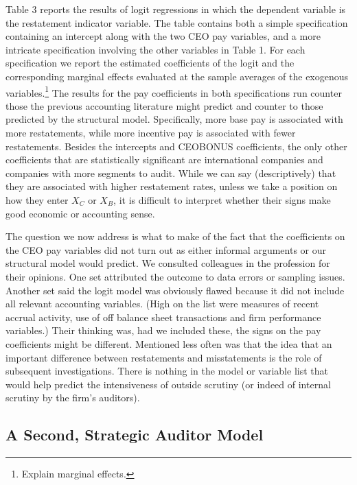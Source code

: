 Table 3 reports the results of logit regressions in which the dependent
variable is the restatement indicator variable. The table contains both a simple 
specification containing an intercept along with the two CEO pay variables, 
and a more intricate specification involving the other variables in Table 1.
For each specification we report the estimated coefficients of the logit and the 
corresponding marginal effects evaluated at the sample averages of the exogenous
variables.\footnote{Explain marginal effects.} The results for the pay coefficients
in both specifications run counter those the previous accounting literature might
predict and counter to those predicted by the structural model.
Specifically,  more base pay is associated with more
restatements, while more incentive pay is associated with fewer restatements.
Besides the intercepts and CEOBONUS coefficients, the only other coefficients 
that are statistically significant are international companies and companies with 
more segments to audit. While we can say (descriptively) that they are associated
with higher restatement rates, unless we take a position on how they enter
 $X_C$ or $X_B$, it is difficult to interpret whether their signs make good economic
or accounting sense.

The question we now address is what to make of the fact that the coefficients
on the CEO pay variables did not turn out as either informal arguments or our
structural model would predict. We consulted colleagues in the
profession for their opinions. One set attributed the outcome to data errors
or sampling issues. Another set said the logit model was obviously flawed because
it did not include all relevant accounting variables. (High on the list were measures
of recent accrual activity, use of off balance sheet transactions and firm
performance variables.) Their thinking was, had we included these, the signs
on the pay coefficients might be different. Mentioned less often was that the idea
that an important difference between restatements and misstatements is the role of subsequent
investigations. There is nothing in the model or variable list that would help predict 
the intensiveness of outside scrutiny (or indeed of internal scrutiny by the firm's auditors).

\subsection{A Second, Strategic Auditor Model}

